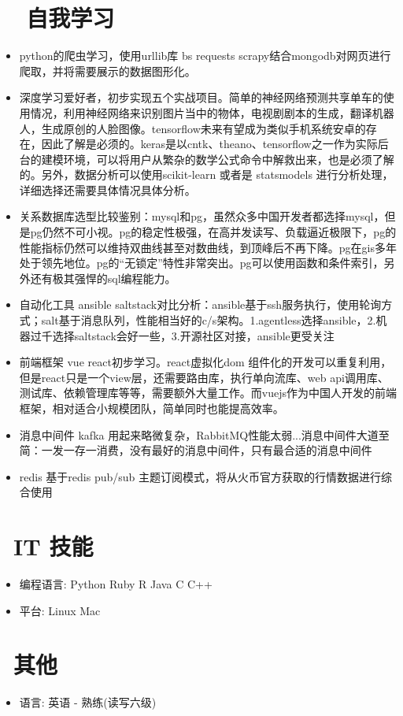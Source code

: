 \documentclass{resume}
\begin{document}
\section{\faHeart~\faHeart\ 自我学习}
\begin{itemize}
  \item python的爬虫学习，使用urllib库 bs requests scrapy结合mongodb对网页进行爬取，并将需要展示的数据图形化。
  \item 深度学习爱好者，初步实现五个实战项目。简单的神经网络预测共享单车的使用情况，利用神经网络来识别图片当中的物体，电视剧剧本的生成，翻译机器人，生成原创的人脸图像。tensorflow未来有望成为类似手机系统安卓的存在，因此了解是必须的。keras是以cntk、theano、tensorflow之一作为实际后台的建模环境，可以将用户从繁杂的数学公式命令中解救出来，也是必须了解的。另外，数据分析可以使用scikit-learn 或者是 statsmodels 进行分析处理，详细选择还需要具体情况具体分析。
  \item 关系数据库选型比较鉴别：mysql和pg，虽然众多中国开发者都选择mysql，但是pg仍然不可小视。pg的稳定性极强，在高并发读写、负载逼近极限下，pg的性能指标仍然可以维持双曲线甚至对数曲线，到顶峰后不再下降。pg在gis多年处于领先地位。pg的“无锁定”特性非常突出。pg可以使用函数和条件索引，另外还有极其强悍的sql编程能力。
  \item 自动化工具 ansible saltstack对比分析：ansible基于ssh服务执行，使用轮询方式；salt基于消息队列，性能相当好的c/s架构。1.agentless选择ansible，2.机器过千选择saltstack会好一些，3.开源社区对接，ansible更受关注
  \item 前端框架 vue react初步学习。react虚拟化dom 组件化的开发可以重复利用，但是react只是一个view层，还需要路由库，执行单向流库、web api调用库、测试库、依赖管理库等等，需要额外大量工作。而vuejs作为中国人开发的前端框架，相对适合小规模团队，简单同时也能提高效率。
  \item 消息中间件 kafka 用起来略微复杂，RabbitMQ性能太弱...消息中间件大道至简：一发一存一消费，没有最好的消息中间件，只有最合适的消息中间件
  \item redis 基于redis pub/sub
  主题订阅模式，将从火币官方获取的行情数据进行综合使用
\end{itemize}


\section{\faCogs\ IT 技能}
\begin{itemize}[parsep=0.5ex]
  \item 编程语言: Python Ruby R Java C C++
  \item 平台: Linux Mac
\end{itemize}



\section{\faInfo\ 其他}
\begin{itemize}[parsep=0.5ex]
  \item 语言: 英语 - 熟练(读写六级)
\end{itemize}

%
%
\end{document}
